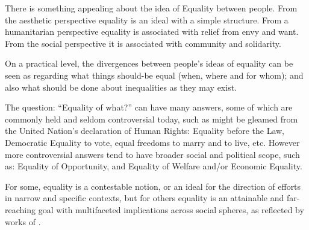 There is something appealing about the idea of Equality between people.
From the aesthetic perspective equality is an ideal with a simple structure. From a humanitarian perspective equality is associated with relief from envy and want. From the social perspective it is associated with community and solidarity.%


On a practical level, the divergences between people's ideas of equality can be seen as regarding what things should-be equal (when, where and for whom); and also what should be done about inequalities as they may exist.

The question: ``Equality of what?'' can have many answers, some of which are commonly held and seldom controversial today, such as might be gleamed from the United Nation's declaration of Human Rights: Equality before the Law, Democratic Equality to vote, equal freedoms to marry and to live, etc.
However more controversial answers tend to have broader social and political scope, such as: Equality of Opportunity, and Equality of Welfare and/or Economic Equality.%

For some, equality is a contestable notion, or an ideal for the direction of efforts in narrow and specific contexts, but for others equality is an attainable and far-reaching goal with multifaceted implications across social spheres, as reflected by works of \cite{walzer2008spheres,millerandwalzer,baker1992arguing}.

